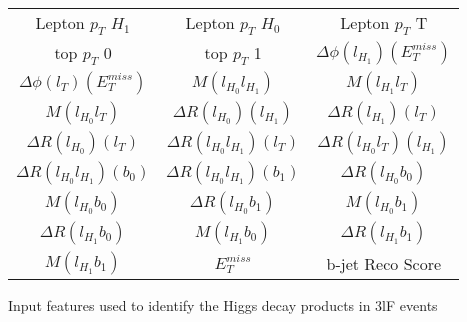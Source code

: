   \begin{center}
  \begin{tabular}{ccc}
    \hline\hline
    Lepton  $p_T$ $H_1$ & Lepton  $p_T$ $H_0$ & Lepton  $p_T$ T \\
    top  $p_T$ 0 & top  $p_T$ 1 & $\Delta\phi(l_{H_1})(E_T^{miss})$ \\
    $\Delta\phi(l_{T})(E_T^{miss})$ & $M(l_{H_0}l_{H_1})$ & $M(l_{H_1}l_{T})$ \\
    $M(l_{H_0}l_{T})$ & $\Delta R(l_{H_0})(l_{H_1})$ & $\Delta R(l_{H_1})(l_{T})$ \\
    $\Delta R(l_{H_0})(l_{T})$ & $\Delta R(l_{H_0}l_{H_1})(l_{T})$ & $\Delta R(l_{H_0}l_{T})(l_{H_1})$ \\
    $\Delta R(l_{H_0}l_{H_1})(b_0)$ & $\Delta R(l_{H_0}l_{H_1})(b_1)$ & $\Delta R(l_{H_0}b_0)$ \\
    $M(l_{H_0}b_0)$ & $\Delta R(l_{H_0}b_1)$ & $M(l_{H_0}b_1)$ \\
    $\Delta R(l_{H_1}b_0)$ & $M(l_{H_1}b_0)$ & $\Delta R(l_{H_1}b_1)$ \\
    $M(l_{H_1}b_1)$ & $E_T^{miss}$ & b-jet Reco Score \\
    \hline
  \end{tabular}
  \end{center}
  \caption{Input features used to identify the Higgs decay products in 3lF events}
  \label{tab:higgsTop3lFfeatures}

